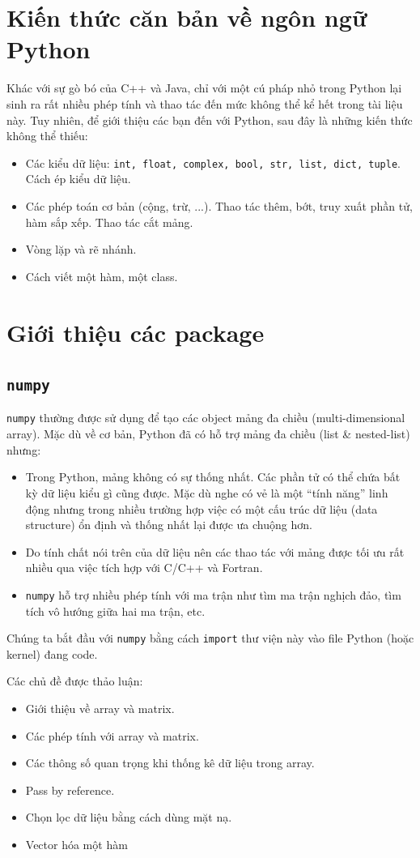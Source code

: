 \documentclass[12pt, a4paper, twoside]{article}
\begin{document}
\section{Kiến thức căn bản về ngôn ngữ Python}
Khác với sự gò bó của C++ và Java, chỉ với một cú pháp nhỏ trong Python lại sinh ra rất nhiều phép tính và thao tác đến mức không thể kể hết trong tài liệu này. Tuy nhiên, để giới thiệu các bạn đến với Python, sau đây là những kiến thức không thể thiếu:
\begin{itemize}
    \item Các kiểu dữ liệu: \texttt{int, float, complex, bool, str, list, dict, tuple}. Cách ép kiểu dữ liệu.
    \item Các phép toán cơ bản (cộng, trừ, ...). Thao tác thêm, bớt, truy xuất phần tử, hàm sắp xếp. Thao tác cắt mảng.
    \item Vòng lặp và rẽ nhánh.
    \item Cách viết một hàm, một class.
\end{itemize}
\section{Giới thiệu các package}
\subsection{\texttt{numpy}}
\texttt{numpy} thường được sử dụng để tạo các object mảng đa chiều (multi-dimensional array). Mặc dù về cơ bản, Python đã có hỗ trợ mảng đa chiều (list \& nested-list) nhưng:
\begin{itemize}
    \item Trong Python, mảng không có sự thống nhất. Các phần tử có thể chứa bất kỳ dữ liệu kiểu gì cũng được. Mặc dù nghe có vẻ là một ``tính năng'' linh động nhưng trong nhiều trường hợp việc có một cấu trúc dữ liệu (data structure) ổn định và thống nhất lại được ưa chuộng hơn.
    \item Do tính chất nói trên của dữ liệu nên các thao tác với mảng được tối ưu rất nhiều qua việc tích hợp với C/C++ và Fortran.
    \item \texttt{numpy} hỗ trợ nhiều phép tính với ma trận như tìm ma trận nghịch đảo, tìm tích vô hướng giữa hai ma trận, etc.
\end{itemize}
Chúng ta bắt đầu với \texttt{numpy} bằng cách \texttt{import} thư viện này vào file Python (hoặc kernel) đang code.

Các chủ đề được thảo luận:
\begin{itemize}
    \item Giới thiệu về array và matrix.
    \item Các phép tính với array và matrix.
    \item Các thông số quan trọng khi thống kê dữ liệu trong array.
    \item Pass by reference.
    \item Chọn lọc dữ liệu bằng cách dùng mặt nạ.
    \item Vector hóa một hàm
\end{itemize}
\end{document}
